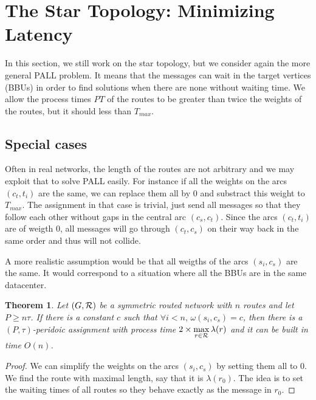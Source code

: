 \documentclass[a4paper,10pt]{article}
\newtheorem{theorem}{Theorem}
\begin{document}
{   \section{The Star Topology: Minimizing Latency}\label{sec:PALL}
    
    In this section, we still work on the star topology, but we consider again the more general PALL problem. It means that the messages can wait in the target vertices (BBUs) in order to find solutions when there are none without waiting time. We allow the process times $PT$ of the routes to be greater than twice the weights of the routes, but it should less than $T_{max}$.

	\subsection{Special cases}
		
		
	Often in real networks, the length of the routes are not arbitrary and we may exploit that to solve PALL easily. For instance if all the weights on the arcs $(c_t,t_i)$ are the same, we can replace them all by $0$ and substract this weight to $T_{max}$.
	The assignment in that case is trivial, just send all messages so that they follow each other without gaps in the central arc $(c_s,c_t)$. Since the arcs $(c_t,t_i)$ are of weigth $0$, all messages will go through $(c_t,c_s)$ on their way back in
	the same order and thus will not collide. 
	
	
	A more realistic assumption would be that all weigths of the arcs $(s_i,c_s)$ are the same. It would correspond to a situation where all the BBUs are in the same datacenter.
	
	 \begin{theorem}
	 Let $(G,{\cal R})$ be a symmetric routed network with $n$ routes and let $P \geq n\tau$. If there is a constant $c$ such that $\forall i < n, \,\omega(s_i,c_s) = c$, then there is a $(P,\tau)$-peridoic assignment with process time $2 \times \displaystyle{\max_{r\in {\cal R}} \lambda(r)}$ and it can be built in time $O(n)$.
	 \end{theorem}
      \begin{proof}
      
        We can simplify the weights on the arcs $(s_i,c_s)$ by setting them all to $0$.
        We find the route with maximal length, say that it is $\lambda(r_0)$. The idea is to 
        set the waiting times of all routes so they behave exactly as the message in $r_0$.
        

\end{proof}}
\end{document}
